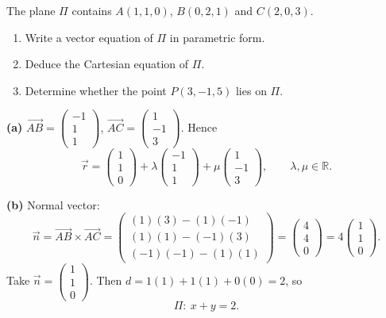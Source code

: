 \documentclass[11pt]{article}
\begin{document}
\begin{exoresolu}
The plane $\Pi$ contains $A(1, 1, 0)$, $B(0, 2, 1)$ and $C(2, 0, 3)$.
\begin{enumerate}
\item[(a)] Write a vector equation of $\Pi$ in parametric form.
\item[(b)] Deduce the Cartesian equation of $\Pi$.
\item[(c)] Determine whether the point $P(3, -1, 5)$ lies on $\Pi$.
\end{enumerate}
\tcblower
\textbf{(a)} $\vec{AB} = \begin{pmatrix} -1 \\ 1 \\ 1 \end{pmatrix}$, $\vec{AC} = \begin{pmatrix} 1 \\ -1 \\ 3 \end{pmatrix}$. Hence
\[ \vec{r} = \begin{pmatrix} 1 \\ 1 \\ 0 \end{pmatrix} + \lambda \begin{pmatrix} -1 \\ 1 \\ 1 \end{pmatrix} + \mu \begin{pmatrix} 1 \\ -1 \\ 3 \end{pmatrix}, \qquad \lambda, \mu \in \mathbb{R}. \]

\textbf{(b)} Normal vector:
\[ \vec{n} = \vec{AB} \times \vec{AC} = \begin{pmatrix} (1)(3) - (1)(-1) \\ (1)(1) - (-1)(3) \\ (-1)(-1) - (1)(1) \end{pmatrix} = \begin{pmatrix} 4 \\ 4 \\ 0 \end{pmatrix} = 4\begin{pmatrix} 1 \\ 1 \\ 0 \end{pmatrix}. \]
Take $\vec{n} = \begin{pmatrix} 1 \\ 1 \\ 0 \end{pmatrix}$. Then $d = 1(1) + 1(1) + 0(0) = 2$, so
\[ \Pi:\ x + y = 2. \]


\end{exoresolu}
\end{document}
